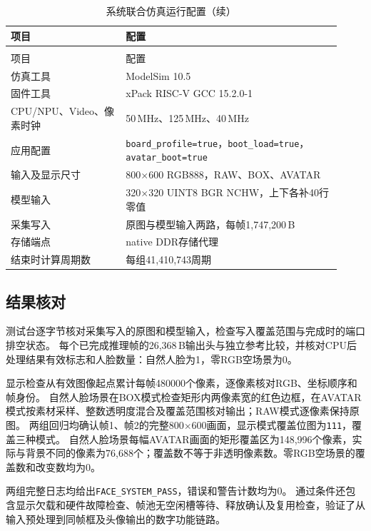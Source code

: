 \begin{reporttable}
\begin{longtable}{@{}p{0.32\linewidth}p{0.60\linewidth}@{}}
\caption{系统联合仿真运行配置}\label{tbl:face-system-run-config}\\
\toprule
项目 & 配置 \\
\midrule
\endfirsthead
\caption[]{系统联合仿真运行配置（续）}\\
\toprule
项目 & 配置 \\
\midrule
\endhead
\bottomrule
\endfoot
仿真工具 & ModelSim 10.5 \\
固件工具 & xPack RISC-V GCC 15.2.0-1 \\
CPU/NPU、Video、像素时钟 & 50\,MHz、125\,MHz、40\,MHz \\
应用配置 & \texttt{board\_profile=true}，\texttt{boot\_load=true}，\texttt{avatar\_boot=true} \\
输入及显示尺寸 & 800$\times$600 RGB888，RAW、BOX、AVATAR \\
模型输入 & 320$\times$320 UINT8 BGR NCHW，上下各补40行零值 \\
采集写入 & 原图与模型输入两路，每帧1,747,200\,B \\
存储端点 & native DDR存储代理 \\
结束时计算周期数 & 每组41,410,743周期 \\
\end{longtable}
\end{reporttable}

\subsection{结果核对}

测试台逐字节核对采集写入的原图和模型输入，检查写入覆盖范围与完成时的端口排空状态。
每个已完成推理帧的26,368\,B输出头与独立参考比较，并核对CPU后处理结果有效标志和人脸数量：自然人脸为1，零RGB空场景为0。

显示检查从有效图像起点累计每帧480000个像素，逐像素核对RGB、坐标顺序和帧身份。
自然人脸场景在BOX模式检查矩形内两像素宽的红色边框，在AVATAR模式按素材采样、整数透明度混合及覆盖范围核对输出；RAW模式逐像素保持原图。
两组回归均确认帧1、帧2的完整800$\times$600画面，显示模式覆盖位图为\texttt{111}，覆盖三种模式。
自然人脸场景每幅AVATAR画面的矩形覆盖区为148,996个像素，实际与背景不同的像素为76,688个；覆盖数不等于非透明像素数。零RGB空场景的覆盖数和改变数均为0。

两组完整日志均给出\texttt{FACE\_SYSTEM\_PASS}，错误和警告计数均为0。
通过条件还包含显示欠载和硬件故障检查、帧池无空闲槽等待、释放确认及复用检查，验证了从输入预处理到同帧框及头像输出的数字功能链路。
